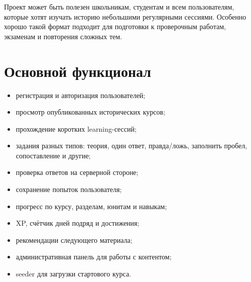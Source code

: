\documentclass[12pt,a4paper]{article}
\begin{document}
Проект может быть полезен школьникам, студентам и всем пользователям, которые
хотят изучать историю небольшими регулярными сессиями. Особенно хорошо такой
формат подходит для подготовки к проверочным работам, экзаменам и повторения
сложных тем.

\section{Основной функционал}

\begin{itemize}
    \item регистрация и авторизация пользователей;
    \item просмотр опубликованных исторических курсов;
    \item прохождение коротких learning-сессий;
    \item задания разных типов: теория, один ответ, правда/ложь, заполнить пробел,
          сопоставление и другие;
    \item проверка ответов на серверной стороне;
    \item сохранение попыток пользователя;
    \item прогресс по курсу, разделам, юнитам и навыкам;
    \item XP, счётчик дней подряд и достижения;
    \item рекомендации следующего материала;
    \item административная панель для работы с контентом;
    \item seeder для загрузки стартового курса.
\end{itemize}



\end{document}
